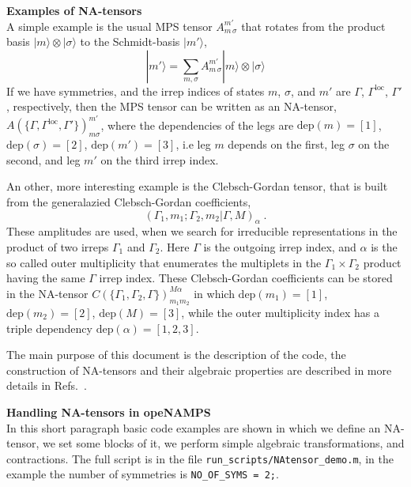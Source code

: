 \documentclass[aps,prb,twocolumn,showpacs,preprintnumbers,amsmath,amssymb, superscriptaddressm, nofootinbib]{revtex4-2}   %
\newcommand{\loc}{\mathrm{loc}}
\newcommand{\dep}{\mathrm{dep}}
\begin{document}
\textbf{Examples of NA-tensors} \\
A simple example is the usual MPS tensor $A_{m\,\sigma}^{m'}$ that rotates from the product basis $|m\rangle \otimes |\sigma \rangle$ to the Schmidt-basis $|m'\rangle$,
\begin{equation}
    |m'\rangle = \sum_{m,\sigma} A_{m\,\sigma}^{m'} |m\rangle \otimes |\sigma \rangle
\end{equation}
If we have symmetries, and the irrep indices of states $m$, $\sigma$, and $m'$ are $\Gamma$, $\Gamma^\loc$, $\Gamma'$, respectively, then the MPS tensor can be written as an NA-tensor, $A(\lbrace \Gamma, \Gamma^\loc, \Gamma' \rbrace)_{m\sigma}^{m'}$, where the dependencies of the legs are $\dep(m) = [1]$, $\dep(\sigma) = [2]$, $\dep(m') = [3]$, i.e leg $m$ depends on the first, leg $\sigma$ on the second, and leg $m'$ on the third irrep index.

An other, more interesting example is the Clebsch-Gordan tensor, that is built from the generalazied Clebsch-Gordan coefficients, 
\begin{equation}
    \left(\Gamma_1, m_1; \Gamma_2, m_2 | \Gamma, M \right)_\alpha \;. 
\end{equation}
These amplitudes are used, when we search for irreducible representations in the product of two irreps $\Gamma_1$ and $\Gamma_2$. Here $\Gamma$ is the outgoing irrep index, and $\alpha$ is the so called outer multiplicity that enumerates the multiplets in the $\Gamma_1 \times \Gamma_2$ product having the same $\Gamma$ irrep index. These Clebsch-Gordan coefficients can be stored in the NA-tensor $C(\lbrace \Gamma_1, \Gamma_2, \Gamma \rbrace)_{m_1 m_2}^{M \alpha}$ in which $\dep(m_1) = [1]$, $\dep(m_2) = [2]$, $\dep(M) = [3]$, while the outer multiplicity index has a triple dependency $\dep(\alpha) = [1,2,3]$.

The main purpose of this document is the description of the code, the construction of NA-tensors and their algebraic properties are described in more details in Refs.~.

\textbf{Handling NA-tensors in opeNAMPS} \\
In this short paragraph basic code examples are shown in which we define an NA-tensor, we set some blocks of it, we perform simple algebraic transformations, and contractions. The full script is in the file \verb|run_scripts/NAtensor_demo.m|, in the example the number of symmetries is \verb|NO_OF_SYMS = 2;|.
\end{document}
